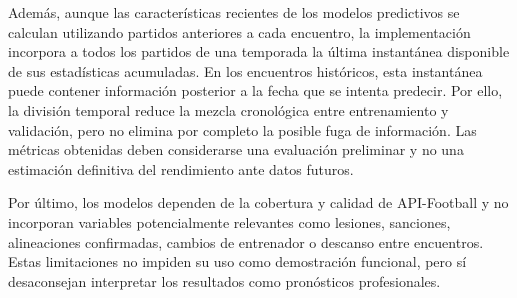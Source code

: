 Además, aunque las características recientes de los modelos predictivos se calculan utilizando partidos anteriores a cada encuentro, la implementación incorpora a todos los partidos de una temporada la última instantánea disponible de sus estadísticas acumuladas. En los encuentros históricos, esta instantánea puede contener información posterior a la fecha que se intenta predecir. Por ello, la división temporal reduce la mezcla cronológica entre entrenamiento y validación, pero no elimina por completo la posible fuga de información. Las métricas obtenidas deben considerarse una evaluación preliminar y no una estimación definitiva del rendimiento ante datos futuros.

Por último, los modelos dependen de la cobertura y calidad de API-Football y no incorporan variables potencialmente relevantes como lesiones, sanciones, alineaciones confirmadas, cambios de entrenador o descanso entre encuentros. Estas limitaciones no impiden su uso como demostración funcional, pero sí desaconsejan interpretar los resultados como pronósticos profesionales.

